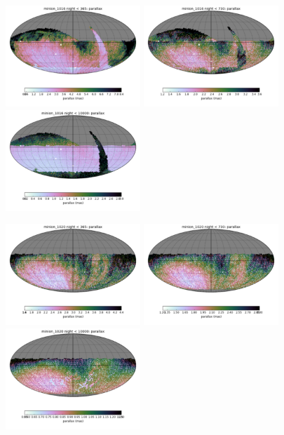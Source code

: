 \begin{figure}[ht]
  \begin{center}
  \includegraphics[width=2.0in]{./figs/milkyway/astromPanels/MW_Astrom_paError_Baseline_01y_map.png}
  \includegraphics[width=2.0in]{./figs/milkyway/astromPanels/MW_Astrom_paError_Baseline_02y_map.png}
  \includegraphics[width=2.0in]{./figs/milkyway/astromPanels/MW_Astrom_paError_Baseline_10y_map.png}
  \end{center}
  \begin{center}
  \includegraphics[width=2.0in]{./figs/milkyway/astromPanels/MW_Astrom_paError_PanSTARRS_01y_map.png}
  \includegraphics[width=2.0in]{./figs/milkyway/astromPanels/MW_Astrom_paError_PanSTARRS_02y_map.png}
  \includegraphics[width=2.0in]{./figs/milkyway/astromPanels/MW_Astrom_paError_PanSTARRS_10y_map.png}
  \end{center}


\end{figure}
